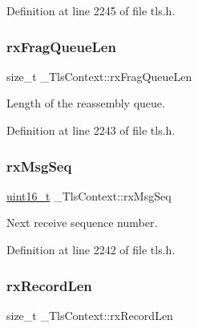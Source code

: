 Definition at line 2245 of file tls.\+h.

\mbox{\label{struct__TlsContext_ae018331ceefbf29baa0f4cbbeb200b32}} 
\subsubsection{\texorpdfstring{rx\+Frag\+Queue\+Len}{rxFragQueueLen}}
{\footnotesize\ttfamily size\+\_\+t \+\_\+\+Tls\+Context\+::rx\+Frag\+Queue\+Len}



Length of the reassembly queue. 



Definition at line 2243 of file tls.\+h.

\mbox{\label{struct__TlsContext_a649cd244f2ef72be8612927074b64b21}} 
\subsubsection{\texorpdfstring{rx\+Msg\+Seq}{rxMsgSeq}}
{\footnotesize\ttfamily \hyperlink{stdint_8h_a273cf69d639a59973b6019625df33e30}{uint16\+\_\+t} \+\_\+\+Tls\+Context\+::rx\+Msg\+Seq}



Next receive sequence number. 



Definition at line 2242 of file tls.\+h.

\mbox{\label{struct__TlsContext_ada661bb5585cab437b391743b7391c9c}} 
\subsubsection{\texorpdfstring{rx\+Record\+Len}{rxRecordLen}}
{\footnotesize\ttfamily size\+\_\+t \+\_\+\+Tls\+Context\+::rx\+Record\+Len}



